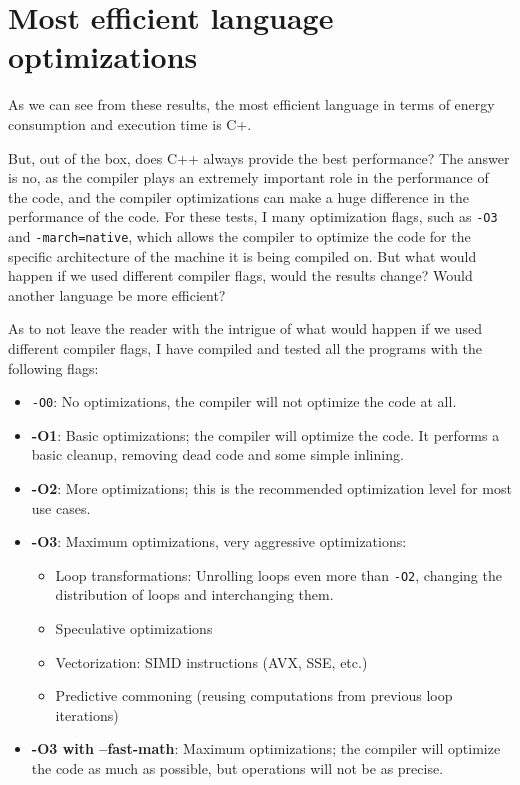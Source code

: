 \section{Most efficient language optimizations}
As we can see from these results, the most efficient language in terms of energy consumption and execution time is C\++. 

But, out of the box, does C++ always provide the best performance? The answer is no, as the compiler plays an extremely important role in the performance of the code, and the compiler optimizations can make a huge difference in the performance of the code.
For these tests, I many optimization flags, such as \texttt{-O3} and \texttt{-march=native}, which allows the compiler to optimize the code for the specific architecture of the machine it is being compiled on. But what would happen if we used different compiler flags, would the results change? Would another language be more efficient?

As to not leave the reader with the intrigue of what would happen if we used different compiler flags, I have compiled and tested all the programs with the following flags:
\begin{itemize}
    \item \texttt{-O0}: No optimizations, the compiler will not optimize the code at all.
    \item \textbf{-O1}: Basic optimizations; the compiler will optimize the code. It performs a basic cleanup, removing dead code and some simple inlining.
    \item \textbf{-O2}: More optimizations; this is the recommended optimization level for most use cases.
    \item \textbf{-O3}: Maximum optimizations, very aggressive optimizations:
    \begin{itemize}
        \item Loop transformations: Unrolling loops even more than \texttt{-O2}, changing the distribution of loops and interchanging them.
        \item Speculative optimizations
        \item Vectorization: \gls{SIMD} instructions (AVX, SSE, etc.)
        \item Predictive commoning (reusing computations from previous loop iterations)
    \end{itemize}
    \item \textbf{-O3 with --fast-math}: Maximum optimizations; the compiler will optimize the code as much as possible, but operations will not be as precise.
\end{itemize}

